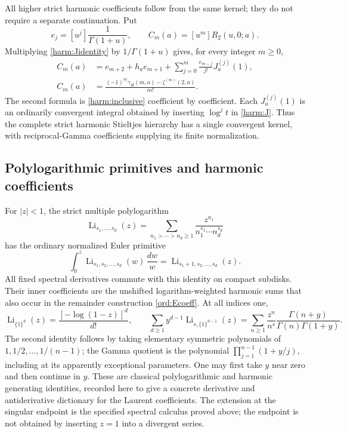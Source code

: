 \documentclass[11pt,letterpaper]{article}
\numberwithin{equation}{section}
\theoremstyle{definition}
\theoremstyle{remark}
\DeclareMathOperator{\Li}{Li}
\begin{document}
All higher strict harmonic coefficients follow from the same kernel;
they do not require a separate continuation. Put
\[
 e_j=[u^j]\frac1{\Gamma(1+u)},\qquad
 C_m(a)=[u^m]R_2(u,0;a).
\]
Multiplying \eqref{harm:Jidentity} by $1/\Gamma(1+u)$ gives, for
every integer $m\ge0$,
\begin{align}\label{harm:allcoefficients}
 C_m(a)&=e_{m+2}+h_a e_{m+1}
       +\sum_{j=0}^m\frac{e_{m-j}}{j!}J_a^{(j)}(1),\\
 C_m(a)&=\frac{(-1)^m\gamma_H(m,a)-\zeta^{(m)}(2,a)}{m!}.
                  \label{harm:allconversion}
\end{align}
The second formula is \eqref{harm:inclusive} coefficient by
coefficient. Each $J_a^{(j)}(1)$ is an ordinarily convergent integral
obtained by inserting $\log^j t$ in \eqref{harm:J}. Thus the complete
strict harmonic Stieltjes hierarchy has a single convergent kernel,
with reciprocal-Gamma coefficients supplying its finite normalization.

\subsection{Polylogarithmic primitives and harmonic coefficients}

For $|z|<1$, the strict multiple polylogarithm
\[
 \Li_{s_1,\ldots,s_d}(z)=
 \sum_{n_1>\cdots>n_d\ge1}
       \frac{z^{n_1}}{n_1^{s_1}\cdots n_d^{s_d}}
\]
has the ordinary normalized Euler primitive
\begin{equation}\label{harm:primitive}
 \int_0^z\Li_{s_1,s_2,\ldots,s_d}(w)\,\frac{dw}{w}
       =\Li_{s_1+1,s_2,\ldots,s_d}(z).
\end{equation}
All fixed spectral derivatives commute with this identity on compact
subdisks. Their inner coefficients are the unshifted logarithm-weighted
harmonic sums that also occur in the remainder construction
\eqref{ord:Ecoeff}. At all indices one,
\begin{equation}\label{harm:allones}
 \Li_{\{1\}^d}(z)=\frac{[-\log(1-z)]^d}{d!},\qquad
 \sum_{d\ge1}y^{d-1}\Li_{s,\{1\}^{d-1}}(z)
 =\sum_{n\ge1}\frac{z^n}{n^s}
             \frac{\Gamma(n+y)}{\Gamma(n)\Gamma(1+y)}.
\end{equation}
The second identity follows by taking elementary symmetric
polynomials of $1,1/2,\ldots,1/(n-1)$; the Gamma quotient is the
polynomial $\prod_{j=1}^{n-1}(1+y/j)$, including at its apparently
exceptional parameters. One may first take $y$ near zero and then
continue in $y$. These are classical
polylogarithmic and harmonic generating identities, recorded here
to give a concrete derivative and antiderivative dictionary for the
Laurent coefficients. The extension at the singular endpoint is the
specified spectral calculus proved above; the endpoint is not obtained
by inserting $z=1$ into a divergent series.
\end{document}
